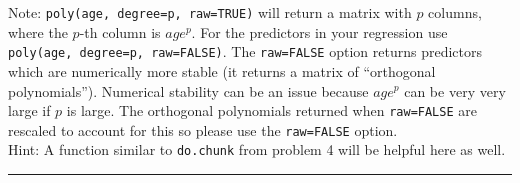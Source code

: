 \documentclass[]{article}
\begin{document}
\begin{enumerate}
  Note: \texttt{poly(age,\ degree=p,\ raw=TRUE)} will return a matrix
  with \(p\) columns, where the \(p\)-th column is \(age^p\). For the
  predictors in your regression use
  \texttt{poly(age,\ degree=p,\ raw=FALSE)}. The \texttt{raw=FALSE}
  option returns predictors which are numerically more stable (it
  returns a matrix of ``orthogonal polynomials''). Numerical stability
  can be an issue because \(age^p\) can be very very large if \(p\) is
  large. The orthogonal polynomials returned when \texttt{raw=FALSE} are
  rescaled to account for this so please use the \texttt{raw=FALSE}
  option.\\
  Hint: A function similar to \texttt{do.chunk} from problem 4 will be
  helpful here as well.
\end{enumerate}

\begin{center}\rule{0.5\linewidth}{\linethickness}\end{center}
\end{document}
